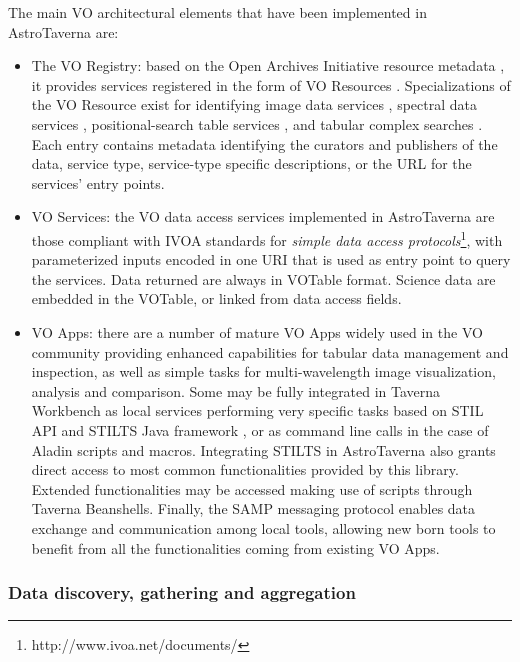 \documentclass{aa}
\begin{document}
The main VO architectural elements that have been implemented in AstroTaverna are:

\begin{itemize}
\item The VO Registry: based on the Open Archives Initiative resource metadata \citep{2002OAI-PMH},  it provides services registered in the form of VO Resources  \citep{Hanisch2007}. Specializations of the VO Resource exist for identifying image data services \citep[Simple Image Access Protocol;][]{Tody2009}, spectral data services \citep[Simple Spectral Access Protocol;][]{Tody2012}, positional-search table services \citep[ConeSearch Protocol;][]{Williams2008}, and tabular complex searches \citep[Tabular Access Protocol;][]{Dowler2010}. Each entry contains metadata identifying the curators and publishers of the data, service type, service-type specific descriptions, or the URL for the services’ entry points. 

\item VO Services: the VO data access services implemented in AstroTaverna are those compliant with IVOA standards for \textit{simple data access protocols}\footnote{http://www.ivoa.net/documents/}, with parameterized inputs encoded in one URI that is used as entry point to query the services. Data returned are always in VOTable format. Science data are embedded in the VOTable, or linked from data access fields.

\item VO Apps: there are a number of mature VO Apps widely used in the VO community providing enhanced capabilities for tabular data management and inspection, as well as simple tasks for multi-wavelength image visualization, analysis and comparison. Some may be fully integrated in Taverna Workbench as local services performing very specific tasks based on STIL API and STILTS Java framework \citep{Taylor2006}, or as command line calls in the case of Aladin scripts and macros. Integrating STILTS in AstroTaverna also grants direct access to most common functionalities provided by this library. Extended functionalities may be accessed making use of scripts through Taverna Beanshells. Finally, the SAMP \citep[Simple Application Messaging Protocol;][]{Taylor2012} messaging protocol enables data exchange and communication among local tools, allowing new born tools to benefit from all the functionalities coming from existing VO Apps.
\end{itemize}

\subsubsection{Data discovery, gathering and aggregation}
\label{DataDiscovery}
\end{document}
